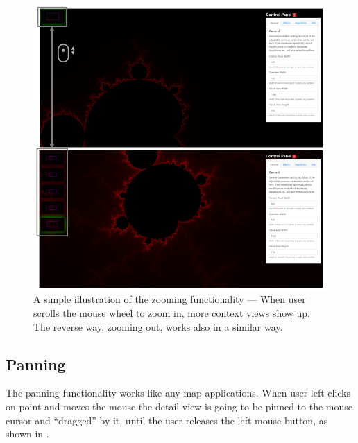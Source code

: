 \begin{figure}[H]
\centering
\includegraphics[width=\textwidth,keepaspectratio]{Figures/Chapter5/zooming.png}
\decoRule
\caption[Zooming Functionality]{A simple illustration of the zooming functionality --- When user scrolls the mouse wheel to zoom in, more context views show up. The reverse way, zooming out, works also in a similar way.}
\label{fig:chap5:zooming}
\end{figure}

\subsection{Panning}

The panning functionality works like any map applications. When user left-clicks on point and moves the mouse the detail view is going to be pinned to the mouse cursor and ``dragged'' by it, until the user releases the left mouse button, as shown in .

